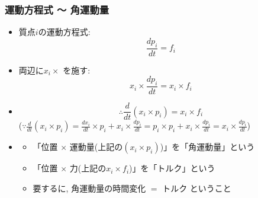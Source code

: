 \documentclass[10pt,dvipdfmx]{beamer}
\newcommand{\ao}[1]{{\color{blue}#1}}
\begin{document}
\begin{frame}
\frametitle{運動方程式 〜 角運動量}

\begin{itemize}
\item [] 質点$i$の運動方程式:
\begin{equation}
\frac{dp_i}{dt} = f_i
\end{equation}

\item [] 両辺に$x_i \times$ を施す:
\begin{equation}
x_i \times \frac{dp_i}{dt} = x_i \times f_i
\end{equation}

\item [] 
\begin{equation}
\therefore \frac{d}{dt}(x_i \times p_i) = x_i \times f_i \label{eq:angular}
\end{equation}
($\because \frac{d}{dt}(x_i \times p_i) = 
\frac{dx_i}{dt} \times p_i + x_i \times \frac{dp_i}{dt}
= p_i \times p_i + x_i \times \frac{dp_i}{dt}
= x_i \times \frac{dp_i}{dt}$)

\item []

\begin{itemize}
\item 「位置 $\times$ 運動量(上記の$(x_i \times p_i)$)」を\ao{「角運動量」}という
\item 「位置 $\times$ 力(上記の$x_i \times f_i$)」を\ao{「トルク」}という
\item 要するに, \ao{角運動量の時間変化 $=$ トルク} ということ
\end{itemize}
\end{itemize}
\end{frame}
\end{document}
